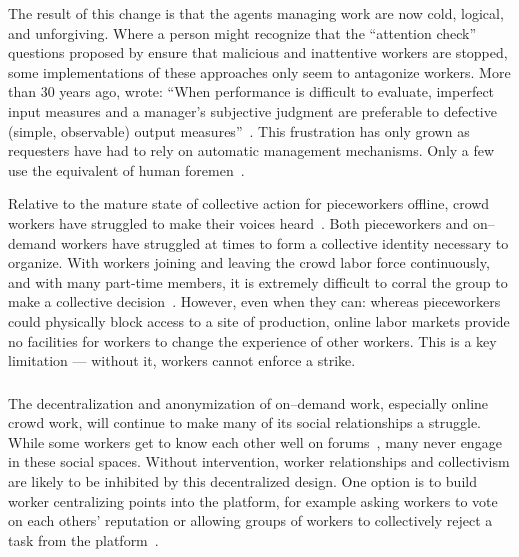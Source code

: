 \documentclass[trackingWork]{subfiles}
\begin{document}
The result of this change is that the agents managing work are now
cold, logical, and unforgiving.
Where a person might recognize that the ``attention check'' questions 
proposed by \citeauthor{le2010ensuring} ensure that malicious and inattentive workers are stopped,
some implementations of these approaches
only seem to antagonize workers.
More than 30 years ago, \citeauthor{10.2307/2555446} wrote:
``When performance is difficult to evaluate,
imperfect input measures and
a manager's subjective judgment are preferable to
defective (simple, observable) output measures''~\cite{10.2307/2555446}.
This frustration has only grown as requesters have had to rely on automatic management mechanisms. Only a few use the equivalent of human foremen~\cite{haas2015argonaut,kulkarni2012mobileworks}.

Relative to the mature state of collective action for pieceworkers offline,
crowd workers have struggled to make their voices heard~\cite{dynamo,storiesIraniSilberman,turkopticon}.
Both pieceworkers and on--demand workers have struggled at times to form a collective identity necessary to organize.
With workers joining and leaving the crowd labor force continuously, and with many part-time members, it is extremely difficult to corral the group to make a collective decision~\cite{dynamo}.
However, even when they can: whereas pieceworkers could physically block access to a site of production, online labor markets provide no facilities for workers to change the experience of other workers.
This is a key limitation --- without it, workers cannot enforce a strike.


\subsubsection{\implication}


The decentralization and anonymization of on--demand work, especially online crowd work, will continue to make many of its social relationships a struggle.
While some workers get to know each other well on forums~\cite{martin2014being,crowdcollab}, many never engage in these social spaces.
Without intervention, worker relationships and collectivism are likely to be inhibited by this decentralized design.
One option is to build worker centralizing points into the platform, for example asking workers to vote on each others' reputation or allowing groups of workers to collectively reject a task from the platform~\cite{crowdguilds}.
\end{document}

